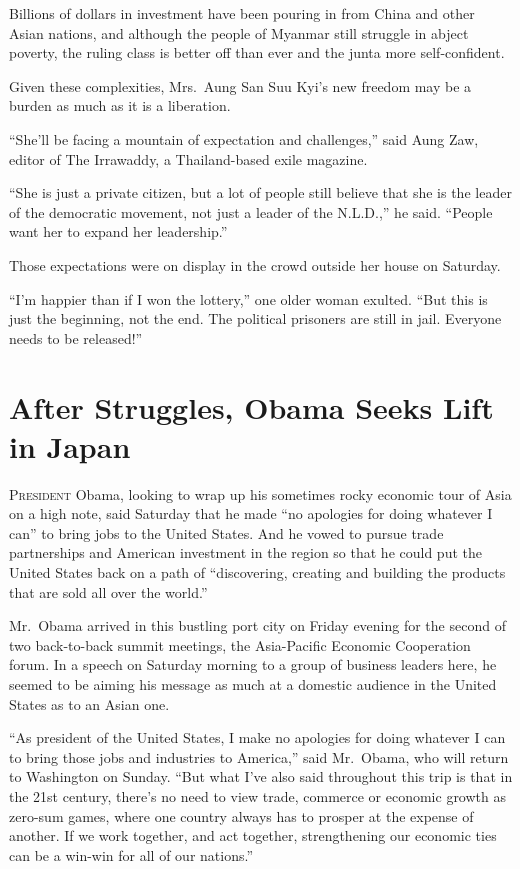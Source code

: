 ﻿\documentclass[12pt]{article}
\begin{document}
Billions of dollars in investment have been pouring in from China and other Asian nations, and
although the people of Myanmar still struggle in abject poverty, the ruling class is better off than
ever and the junta more self-confident.

Given these complexities, Mrs.~Aung San Suu Kyi's new freedom may be a burden as much as it is a
liberation.

``She'll be facing a mountain of expectation and challenges,'' said Aung Zaw, editor of The
Irrawaddy, a Thailand-based exile magazine.

``She is just a private citizen, but a lot of people still believe that she is the leader of the
democratic movement, not just a leader of the N.L.D.,'' he said. ``People want her to expand her
leadership.''

Those expectations were on display in the crowd outside her house on Saturday.

``I'm happier than if I won the lottery,'' one older woman exulted. ``But this is just the
beginning, not the end. The political prisoners are still in jail. Everyone needs to be released!''

\section{After Struggles, Obama Seeks Lift in Japan}

\lettrine{P}{resident} Obama, looking to wrap up his sometimes rocky
economic tour of Asia on a high note, said Saturday that he made ``no apologies for doing whatever I
can'' to bring jobs to the United States. And he vowed to pursue trade partnerships and American
investment in the region so that he could put the United States back on a path of ``discovering,
creating and building the products that are sold all over the world.''

Mr.~Obama arrived in this bustling port city on Friday evening for the second of two back-to-back
summit meetings, the Asia-Pacific Economic Cooperation forum. In a speech on Saturday morning to a
group of business leaders here, he seemed to be aiming his message as much at a domestic audience in
the United States as to an Asian one.

``As president of the United States, I make no apologies for doing whatever I can to bring those
jobs and industries to America,'' said Mr.~Obama, who will return to Washington on Sunday. ``But
what I've also said throughout this trip is that in the 21st century, there's no need to view trade,
commerce or economic growth as zero-sum games, where one country always has to prosper at the
expense of another. If we work together, and act together, strengthening our economic ties can be a
win-win for all of our nations.''
\end{document}
